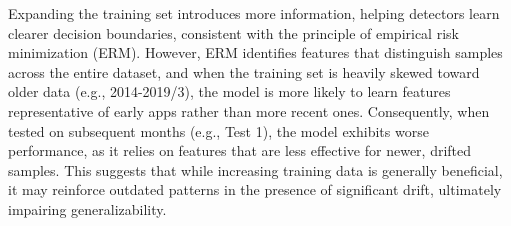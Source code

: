 Expanding the training set introduces more information, helping detectors learn clearer decision boundaries, consistent with the principle of empirical risk minimization (ERM).
However, ERM identifies features that distinguish samples across the entire dataset, and when the training set is heavily skewed toward older data (e.g., 2014-2019/3), the model is more likely to learn features representative of early apps rather than more recent ones. Consequently, when tested on subsequent months (e.g., Test 1), the model exhibits worse performance, as it relies on features that are less effective for newer, drifted samples. This suggests that while increasing training data is generally beneficial, it may reinforce outdated patterns in the presence of significant drift, ultimately impairing generalizability.

